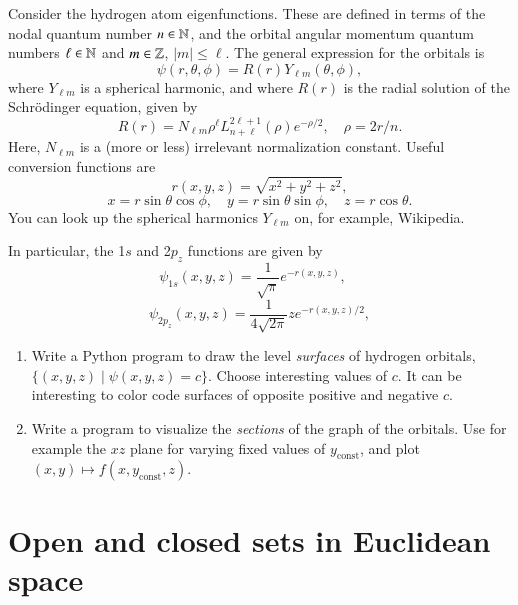 \documentclass[12pt]{report}
\begin{document}
Consider the hydrogen atom eigenfunctions. These are defined in terms of the nodal quantum number $n \in \mathbb{N}$, and the orbital angular momentum quantum numbers $\ell \in \mathbb{N}$ and $m \in \mathbb{Z}$, $|m| \leq \ell$. The general expression for the orbitals is
\begin{equation}
    \psi(r,\theta,\phi) = R(r) Y_{\ell m}(\theta,\phi),
\end{equation}
where $Y_{\ell m}$ is a spherical harmonic, and where $R(r)$ is the radial solution of the Schr\"odinger equation, given by
\begin{equation}
    R(r) = N_{\ell m} \rho^\ell L^{2\ell + 1}_{n + \ell}(\rho) e^{-\rho/2}, \quad \rho = 2r/n.
\end{equation}
Here, $N_{\ell m}$ is a (more or less) irrelevant normalization constant. Useful conversion functions are
\begin{equation}
    r(x,y,z) = \sqrt{x^2+y^2+z^2}, 
\end{equation}
\begin{equation}
    x = r\sin\theta \cos\phi, \quad y = r\sin\theta\sin\phi, \quad z = r \cos\theta.
\end{equation}
You can look up the spherical harmonics $Y_{\ell m}$ on, for example, Wikipedia.

In particular, the 1$s$ and 2$p_z$ functions are given by
\begin{equation}
    \psi_{1s}(x,y,z) = \frac{1}{\sqrt{\pi}} e^{-r(x,y,z)}, \quad 
\end{equation}
\begin{equation}
    \psi_{2p_z}(x,y,z) = \frac{1}{4\sqrt{2\pi}} z e^{-r(x,y,z)/2},
\end{equation}
\begin{enumerate}[resume]
\item Write a Python program to draw the level \emph{surfaces} of hydrogen orbitals, $\{ (x,y,z)\mid  \psi(x,y,z) = c \}$. Choose interesting values of $c$. It can be interesting to color code surfaces of opposite positive and negative $c$.
\item Write a program to visualize the \emph{sections} of the graph of the orbitals.  Use for example the $xz$ plane for varying fixed values of $y_\text{const}$, and plot $(x,y)\mapsto f(x,y_\text{const},z)$. 
\end{enumerate}


\section{Open and closed sets in Euclidean space}
\end{document}

